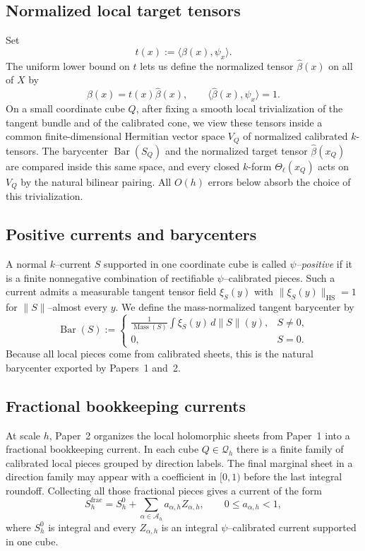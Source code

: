 \documentclass[11pt]{article}
\numberwithin{equation}{section}
\theoremstyle{plain}
\theoremstyle{definition}
\theoremstyle{remark}
\DeclareMathOperator{\Mass}{Mass}
\DeclareMathOperator{\HS}{HS}
\newcommand{\calQ}{\mathcal{Q}}
\newcommand{\calA}{\mathcal{A}}
\newcommand{\Bary}{\operatorname{Bar}}
\begin{document}
\subsection{Normalized local target tensors}

Set
\[
t(x):=\langle\beta(x),\psi_x\rangle.
\]
The uniform lower bound on $t$ lets us define the normalized tensor $\widehat\beta(x)$ on all of $X$ by
\[
\beta(x)=t(x)\widehat\beta(x),
\qquad
\langle \widehat\beta(x),\psi_x\rangle=1.
\]
On a small coordinate cube $Q$, after fixing a smooth local trivialization of the tangent bundle and of the calibrated cone, we view these tensors inside a common finite-dimensional Hermitian vector space $V_Q$ of normalized calibrated $k$-tensors.  The barycenter $\Bary(S_Q)$ and the normalized target tensor $\widehat\beta(x_Q)$ are compared inside this same space, and every closed $k$-form $\Theta_\ell(x_Q)$ acts on $V_Q$ by the natural bilinear pairing.  All $O(h)$ errors below absorb the choice of this trivialization.

\subsection{Positive currents and barycenters}

A normal $k$--current $S$ supported in one coordinate cube is called \emph{$\psi$--positive} if it is a finite nonnegative combination of rectifiable $\psi$--calibrated pieces.  Such a current admits a measurable tangent tensor field $\xi_S(y)$ with $\|\xi_S(y)\|_{\HS}=1$ for $\|S\|$--almost every $y$.  We define the mass-normalized tangent barycenter by
\[
\Bary(S):=
\begin{cases}
\displaystyle \frac{1}{\Mass(S)}\int \xi_S(y)\,d\|S\|(y), & S\ne 0,\\[1.2ex]
0, & S=0.
\end{cases}
\]
Because all local pieces come from calibrated sheets, this is the natural barycenter exported by Papers~1 and~2.

\subsection{Fractional bookkeeping currents}

At scale $h$, Paper~2 organizes the local holomorphic sheets from Paper~1 into a fractional bookkeeping current.  In each cube $Q\in\calQ_h$ there is a finite family of calibrated local pieces grouped by direction labels.  The final marginal sheet in a direction family may appear with a coefficient in $[0,1)$ before the last integral roundoff.  Collecting all those fractional pieces gives a current of the form
\[
S_h^{\mathrm{frac}}=S_h^0+\sum_{\alpha\in\calA_h} a_{\alpha,h} Z_{\alpha,h},
\qquad 0\le a_{\alpha,h}<1,
\]
where $S_h^0$ is integral and every $Z_{\alpha,h}$ is an integral $\psi$--calibrated current supported in one cube.
\end{document}
